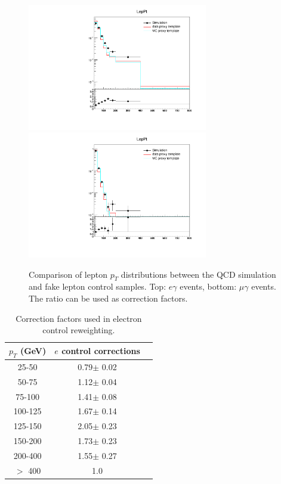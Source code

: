 \documentclass[thesis.tex]{subfiles}
\renewcommand\_{\textunderscore\allowbreak}
\begin{document}
\begin{figure}[hbtp]\begin{center}
    \includegraphics[width=0.7\textwidth]{Figures/faketemp_electron_LepPt.pdf} \\
    \includegraphics[width=0.7\textwidth]{Figures/faketemp_muon_LepPt.pdf}
    \caption{Comparison of lepton $p_T$ distributions between the QCD simulation and fake lepton control samples. Top: $e\gamma$ events, bottom: $\mu\gamma$ events. The ratio can be used as correction factors.}
        \label{fig:reweight_fakelep}
\end{center}\end{figure}

\begin{table}[ht]
  \caption{Correction factors used in electron control reweighting.}
  \label{table:correctionsfakelep}
	\centering
  \begin{tabular}{|c|c|c|}
  \hline
  $p_T$ (GeV)  & $e$ control corrections \\ \hline
  25-50  & 0.79$\pm$ 0.02  \\ \hline
  50-75  & 1.12$\pm$ 0.04  \\ \hline
  75-100 & 1.41$\pm$ 0.08  \\ \hline 
  100-125& 1.67$\pm$ 0.14  \\ \hline 
  125-150& 2.05$\pm$ 0.23  \\ \hline 
  150-200& 1.73$\pm$ 0.23  \\ \hline
  200-400& 1.55$\pm$ 0.27  \\ \hline
  $>$ 400& 1.0 \\ \hline 
  \end{tabular}
\end{table}
\end{document}
